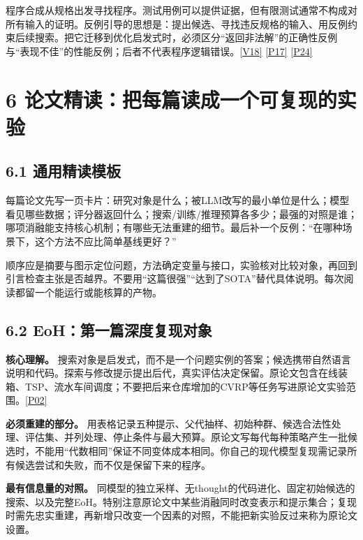 程序合成从规格出发寻找程序。测试用例可以提供证据，但有限测试通常不构成对所有输入的证明。反例引导的思想是：提出候选、寻找违反规格的输入、用反例约束后续搜索。把它迁移到优化启发式时，必须区分``返回非法解''的正确性反例与``表现不佳''的性能反例；后者不代表程序逻辑错误。\href{https://people.csail.mit.edu/asolar/SynthesisCourse/index.htm}{{[}V18{]}}
\href{https://arxiv.org/abs/2108.07732}{{[}P17{]}}
\href{https://arxiv.org/abs/2403.03997}{{[}P24{]}}

\section{6
论文精读：把每篇读成一个可复现的实验}\label{ux8bbaux6587ux7cbeux8bfbux628aux6bcfux7bc7ux8bfbux6210ux4e00ux4e2aux53efux590dux73b0ux7684ux5b9eux9a8c}

\subsection{6.1
通用精读模板}\label{ux901aux7528ux7cbeux8bfbux6a21ux677f}

每篇论文先写一页卡片：研究对象是什么；被LLM改写的最小单位是什么；模型看见哪些数据；评分器返回什么；搜索/训练/推理预算各多少；最强的对照是谁；哪项消融能支持核心机制；有哪些无法重建的细节。最后补一个反例：``在哪种场景下，这个方法不应比简单基线更好？''

顺序应是摘要与图示定位问题，方法确定变量与接口，实验核对比较对象，再回到引言检查主张是否越界。不要用``这篇很强''``达到了SOTA''替代具体说明。每次阅读都留一个能运行或能核算的产物。

\subsection{6.2
EoH：第一篇深度复现对象}\label{eohux7b2cux4e00ux7bc7ux6df1ux5ea6ux590dux73b0ux5bf9ux8c61}

\textbf{核心理解。}
搜索对象是启发式，而不是一个问题实例的答案；候选携带自然语言说明和代码。探索与修改提示提出后代，真实评估决定保留。原论文包含在线装箱、TSP、流水车间调度；不要把后来仓库增加的CVRP等任务写进原论文实验范围。\href{https://arxiv.org/abs/2401.02051}{{[}P02{]}}

\textbf{必须重建的部分。}
用表格记录五种提示、父代抽样、初始种群、候选合法性处理、评估集、并列处理、停止条件与最大预算。原论文写每代每种策略产生一批候选时，不能用``代数相同''保证不同变体成本相同。你自己的现代模型复现需记录所有候选尝试和失败，而不仅是保留下来的程序。

\textbf{最有信息量的对照。}
同模型的独立采样、无thought的代码进化、固定初始候选的搜索、以及完整EoH。特别注意原论文中某些消融同时改变表示和提示集合；复现时需先忠实重建，再新增只改变一个因素的对照，不能把新实验反过来称为原论文设置。

